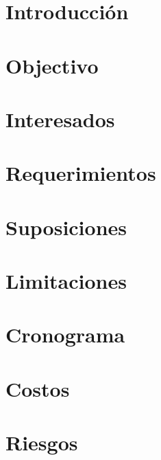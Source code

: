 \documentclass[a4paper,11pt]{article}
\begin{document}

\section{Introducción}
\baselineskip=18pt

\section{Objectivo}

\section{Interesados}

\section{Requerimientos}

\section{Suposiciones}

\section{Limitaciones}

\section{Cronograma}

\section{Costos}

\section{Riesgos}
\end{document}
